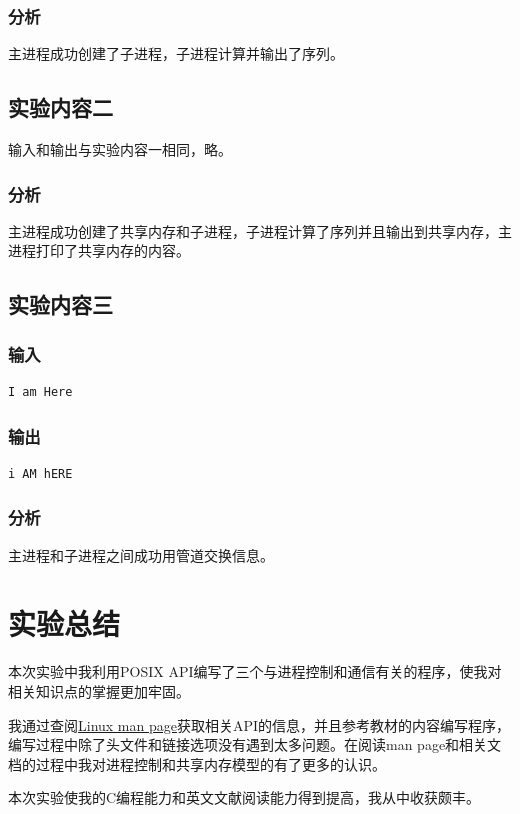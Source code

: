 \documentclass[lang=cn,11pt,a4paper,cite=authornum]{paper}
\begin{document}
\subsubsection{分析}

主进程成功创建了子进程，子进程计算并输出了序列。

\subsection{实验内容二}

输入和输出与实验内容一相同，略。

\subsubsection{分析}

主进程成功创建了共享内存和子进程，子进程计算了序列并且输出到共享内存，主进程打印了共享内存的内容。

\subsection{实验内容三}

\subsubsection{输入}

\begin{code}
\begin{verbatim}
I am Here
\end{verbatim}
\end{code}

\subsubsection{输出}

\begin{code}
\begin{verbatim}
i AM hERE
\end{verbatim}
\end{code}

\subsubsection{分析}

主进程和子进程之间成功用管道交换信息。

\section{实验总结}

本次实验中我利用POSIX API编写了三个与进程控制和通信有关的程序，使我对相关知识点的掌握更加牢固。

我通过查阅\href{https://man7.org/linux/man-pages/index.html}{Linux man page}获取相关API的信息，并且参考教材的内容编写程序，编写过程中除了头文件和链接选项没有遇到太多问题。在阅读man page和相关文档的过程中我对进程控制和共享内存模型的有了更多的认识。

本次实验使我的C编程能力和英文文献阅读能力得到提高，我从中收获颇丰。
\end{document}
